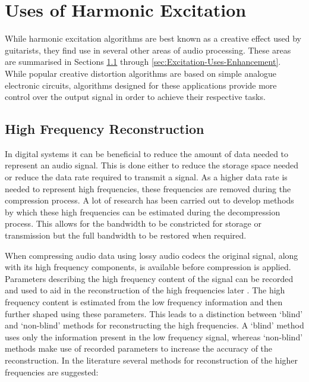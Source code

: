 \section{Uses of Harmonic Excitation}
\label{sec:Excitation-Uses}
	While harmonic excitation algorithms are best known as a creative effect used by guitarists, they find use in
	several other areas of audio processing. These areas are summarised in Sections
	\ref{sec:Excitation-Uses-Reconstruction} through \ref{sec:Excitation-Uses-Enhancement}. While popular creative
	distortion algorithms are based on simple analogue electronic circuits, algorithms designed for these applications
	provide more control over the output signal in order to achieve their respective tasks.

	\subsection{High Frequency Reconstruction}
	\label{sec:Excitation-Uses-Reconstruction}
		In digital systems it can be beneficial to reduce the amount of data needed to represent an audio signal.
		This is done either to reduce the storage space needed or reduce the data rate required to transmit a
		signal. As a higher data rate is needed to represent high frequencies, these frequencies are removed during
		the compression process. A lot of research has been carried out to develop methods by which these high
		frequencies can be estimated during the decompression process. This allows for the bandwidth to be
		constricted for storage or transmission but the full bandwidth to be restored when required.

		When compressing audio data using lossy audio codecs the original signal, along with its high frequency
		components, is available before compression is applied. Parameters describing the high frequency content of
		the signal can be recorded and used to aid in the reconstruction of the high frequencies later
		\citep{dietz2002spectral, friedrich2007spectral}. The high frequency content is estimated from the low
		frequency information and then further shaped using these parameters. This leads to a distinction between
		`blind' and `non-blind' methods for reconstructing the high frequencies. A `blind' method uses only the
		information present in the low frequency signal, whereas `non-blind' methods make use of recorded
		parameters to increase the accuracy of the reconstruction. In the literature several methods for
		reconstruction of the higher frequencies are suggested:

